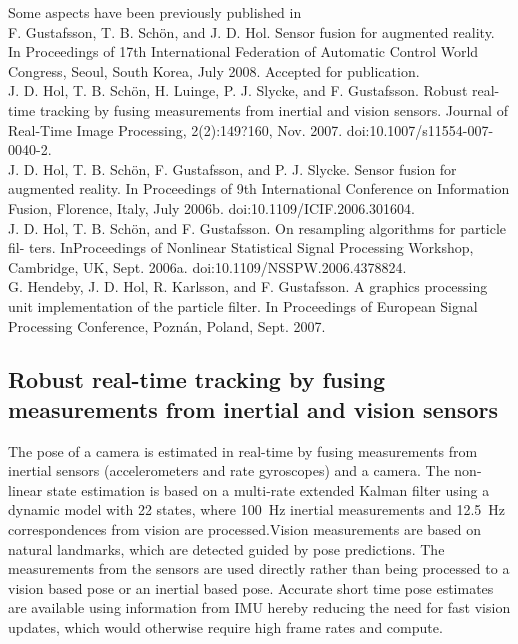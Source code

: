 Some aspects have been previously published in \\
F. Gustafsson, T. B. Sch{\"o}n, and J. D. Hol. Sensor fusion for augmented reality. In Proceedings of 17th International Federation of Automatic Control World Congress, Seoul, South Korea, July 2008. Accepted for publication. \\
J. D. Hol, T. B. Sch{\"o}n, H. Luinge, P. J. Slycke, and F. Gustafsson. Robust real-time tracking by fusing measurements from inertial and vision sensors. Journal of Real-Time Image Processing, 2(2):149?160, Nov. 2007. doi:10.1007/s11554-007-0040-2. \\
J. D. Hol, T. B. Sch{\"o}n, F. Gustafsson, and P. J. Slycke. Sensor fusion for augmented reality. In Proceedings of 9th International Conference on Information Fusion, Florence, Italy, July 2006b. doi:10.1109/ICIF.2006.301604. \\
J. D. Hol, T. B. Sch{\"o}n, and F. Gustafsson. On resampling algorithms for particle fil- ters. InProceedings of Nonlinear Statistical Signal Processing Workshop, Cambridge, UK, Sept. 2006a. doi:10.1109/NSSPW.2006.4378824. \\
G. Hendeby, J. D. Hol, R. Karlsson, and F. Gustafsson. A graphics processing unit
implementation of the particle filter. In Proceedings of European Signal Processing Conference, Pozn{\'a}n, Poland, Sept. 2007.

\subsection{Robust real-time tracking by fusing measurements from inertial and vision 	sensors} %

The pose of a camera is estimated in real-time by fusing measurements from inertial sensors (accelerometers and rate gyroscopes) and a camera. The non-linear state estimation is based on a multi-rate extended Kalman filter using a dynamic model with 22 states, where \SI{100}{\Hz} inertial measurements and \SI{12.5}{\Hz} correspondences from vision are processed.Vision measurements are based on natural landmarks, which are detected guided by pose predictions. The measurements from the sensors are used directly rather than being processed to a vision based pose or an inertial based pose. Accurate short time pose estimates are available using information from IMU hereby reducing the need for fast vision updates, which would otherwise require high frame rates and compute.


